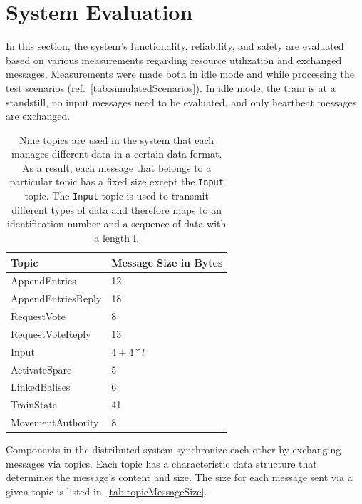 \section{System Evaluation}

In this section, the system's functionality, reliability, and safety are evaluated based on various measurements regarding resource utilization and exchanged messages.
Measurements were made both in idle mode and while processing the test scenarios (ref.~\autoref{tab:simulatedScenarios}).
In idle mode, the train is at a standstill, no input messages need to be evaluated, and only heartbeat messages are exchanged.

\begin{table}[h!]
	\begin{center}
		\caption{Nine topics are used in the system that each manages different data in a certain data format. As a result, each message that belongs to a particular topic has a fixed size except the \texttt{Input} topic. The \texttt{Input} topic is used to transmit different types of data and therefore maps to an identification number and a sequence of data with a length \textbf{l}.}
		\label{tab:topicMessageSize}
		\begin{tabularx}{\textwidth}{|X|X|}
			\hline
			\textbf{Topic} & \textbf{Message Size in Bytes} \\
			\hline \hline
			AppendEntries & 12 \\
			\hline
			AppendEntriesReply & 18 \\
			\hline
			RequestVote & 8 \\
			\hline
			RequestVoteReply & 13 \\
			\hline
			Input & $4 + 4 * l$  \\
			\hline
			ActivateSpare & 5 \\
			\hline
			LinkedBalises & 6 \\
			\hline
			TrainState & 41 \\
			\hline
			MovementAuthority & 8 \\
			\hline
		\end{tabularx}
	\end{center}
\end{table}

Components in the distributed system synchronize each other by exchanging messages via  topics.
Each topic has a characteristic data structure that determines the message's content and size.
The size for each message sent via a given topic is listed in~\autoref{tab:topicMessageSize}.
\\

